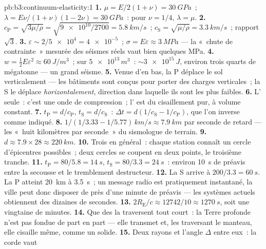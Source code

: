 \begin{solution}{pb:b3:continuum-elasticity:1}
\textbf{1.} $\mu = E/2(1+\nu) = \qty{30}{GPa}$~; $\lambda =
E\nu/(1+\nu)(1-2\nu) = \qty{30}{GPa}$~: pour $\nu = 1/4$, $\lambda =
\mu$.
\textbf{2.} $c_{\text{P}} = \sqrt{3\mu/\rho} = \sqrt{\num{9e10}/2700}
= \qty{5.8}{km/s}$~; $c_{\text{S}} = \sqrt{\mu/\rho} =
\qty{3.3}{km/s}$~; rapport $\sqrt3$.
\textbf{3.} $\varepsilon \sim 2/\num{5e4} = \num{4e-5}$~; $\sigma =
E\varepsilon \approx \qty{3}{MPa}$ --- la «~chute de contrainte~»
mesurée des séismes réels vaut bien quelques MPa.
\textbf{4.} $w = \tfrac12 E\varepsilon^2 \approx \qty{60}{J/m^3}$~;
sur $\num{5e13}{}\,\unit{m^3}$~: $\sim\qty{3e15}{J}$, environ
trois quarts de mégatonne --- un grand séisme.
\textbf{5.} Venue d'en bas, la P déplace le sol verticalement --- les
bâtiments sont conçus pour porter des charges verticales~; la S le
déplace \emph{horizontalement}, direction dans laquelle ils sont les
plus faibles.
\textbf{6.} L' seule~: c'est une onde de compression~; l'
est du cisaillement pur, à volume constant.
\textbf{7.} $t_{\text{P}} = d/c_{\text{P}}$, $t_{\text{S}} =
d/c_{\text{S}}$~: $\Delta t = d(1/c_{\text{S}} - 1/c_{\text{P}})$,
que l'on inverse comme indiqué.
\textbf{8.} $1/(1/3.33 - 1/5.77)\,\unit{km/s} \approx
\qty{7.9}{km}$ par seconde de retard --- les «~huit kilomètres par
seconde~» du sismologue de terrain.
\textbf{9.} $d \approx 7.9 \times 28 \approx \qty{220}{km}$.
\textbf{10.} Trois en général~: chaque station connaît un cercle
d'épicentres possibles~; deux cercles se coupent en deux points, le
troisième tranche.
\textbf{11.} $t_{\text{P}} = 80/5.8 = \qty{14}{s}$, $t_{\text{S}} =
80/3.3 = \qty{24}{s}$~: environ \qty{10}{s} de préavis entre la
secousse et le tremblement destructeur.
\textbf{12.} La S arrive à $200/3.3 = \qty{60}{s}$. La P atteint
\qty{20}{km} à \qty{3.5}{s}~; un message radio est pratiquement
instantané, la ville peut donc disposer de près d'une minute de
préavis --- les systèmes actuels obtiennent des dizaines de secondes.
\textbf{13.} $2R_{\text{E}}/c \approx 12742/10 \approx \qty{1270}{s}$,
soit une vingtaine de minutes.
\textbf{14.} Que des  la traversent tout court~: la
Terre profonde n'est pas fondue de part en part --- elle transmet et,
les  traversant le manteau, elle cisaille même, comme un solide.
\textbf{15.} Deux rayons et l'angle $\Delta$ entre eux~: la corde vaut

\end{solution}
